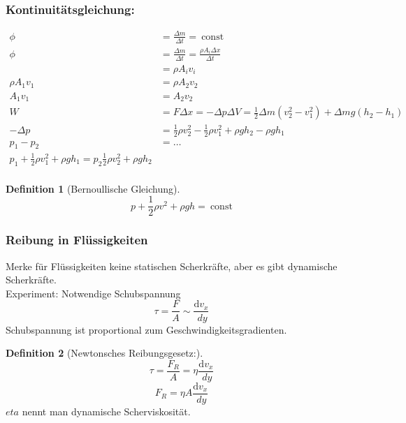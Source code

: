 \documentclass[a4paper]{scrartcl}
\renewcommand{\d}{\mathrm{d}}
\newcommand{\dd}[2]{\frac{\d #1}{\ d#2}}
\theoremstyle{definition}
\newtheorem{defn}{Definition}
\theoremstyle{plain}
\theoremstyle{plain}
\theoremstyle{remark}
\theoremstyle{remark}
\theoremstyle{remark}
\begin{document}
\subsubsection{Kontinuitätsgleichung:}
\label{sec-9-6-1}
\begin{align*}
\phi &= \frac{\Delta m}{\Delta t} = ~\text{const} \\
\phi &= \frac{\Delta m}{\Delta t} = \frac{\rho A_i \Delta x}{\Delta t} \\
&= \rho A_i v_i \\
\rho A_1 v_1 &= \rho A_2 v_2 \\
A_1 v_1 &= A_2 v_2 \\
W &= F \Delta x = - \Delta p \Delta V = \frac{1}{2} \Delta m(v_2^2 - v_1^2) + \Delta mg(h_2 - h_1) \\
-\Delta p &= \frac{1}{2} \rho v_2^2 - \frac{1}{2} \rho v_1^2 + \rho gh_2 - \rho gh_1 \\
p_1- p_2 &= \ldots \\
p_1 + \frac{1}{2} \rho v_1^2 + \rho g h_1 = p_2 \frac{1}{2} \rho v_2^2 + \rho g h_2 \\
\end{align*}
\begin{defn}[Bernoullische Gleichung]
\[p + \frac{1}{2} \rho v^2 + \rho g h = ~\text{const}\]
\end{defn}
\subsubsection{Reibung in Flüssigkeiten}
\label{sec-9-6-2}
Merke für Flüssigkeiten keine statischen Scherkräfte, aber es gibt dynamische Scherkräfte. \\
        Experiment: Notwendige Schubspannung
\[\tau = \frac{F}{A} \sim \dd{v_x}{y}\]
Schubspannung ist proportional zum Geschwindigkeitsgradienten.
\begin{defn}[Newtonsches Reibungsgesetz:]
\[\tau = \frac{F_R}{A} = \eta \dd{v_x}{y}\]
\[F_R = \eta A \dd{v_x}{y}\]
$eta$ nennt man dynamische Scherviskosität.
\end{defn}
\end{document}
